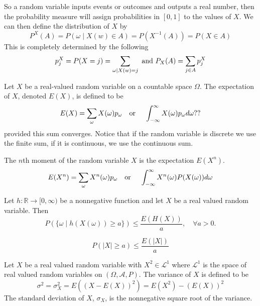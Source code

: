 \documentclass[../main.tex]{subfiles}
\begin{document}
\begin{remark}
So a random variable inputs events or outcomes and outputs a real number, then the probability measure will assign probabilities in $[0,1]$ to the values of $X$.
We can then define the distribution of $X$ by
\[
P^X(A) = P({\omega \mid X(w) \in A}) = P(X^{-1}(A)) = P(X \in A)
\]
This is completely determined by the following 
\[
p_j^X = P(X=j) = \sum_{\omega \mid X(w) =j} \textnormal{ and } P_X(A) = \sum_{j \in A}{p^X_j}
\]
\end{remark}

\begin{definition}
Let $X$ be a real-valued random variable on a countable space $\Omega$. The expectation of $X$, denoted $E(X)$, is defined to be 
\[
E(X) = \sum_{\omega}{X(\omega)p_\omega} \quad \textnormal{or } \quad \int_{-\infty}^{\infty}X(\omega)p_\omega d\omega??
\]
provided this sum converges. Notice that if the random variable is discrete we use the finite sum, if it is continuous, we use the continuous sum.
\end{definition}

\begin{definition}
The $n$th moment of the random variable $X$ is the expectation $E(X^n)$. 
\[
E(X^n) = \sum_{\omega}{X^n(\omega)p_\omega} \quad \textnormal{or } \quad \int_{-\infty}^{\infty}X^n(\omega)P(X(\omega)) d\omega
\]
\end{definition}



\begin{theorem}
Let $h: \mathbb{R} \to [0,\infty)$ be a nonnegative function and let $X$ be a real valued random variable. Then 
\[
P(\{\omega \mid h(X(\omega)) \geq a\}) \leq \frac{E(H(X))}{a}, \quad \forall a > 0.
\]
\end{theorem}



\begin{corollary} \label{Markovs Inequality}
\[
P({|X| \geq a}) \leq \frac{E(|X|)}{a}
\]

\end{corollary}



\begin{definition}\label{def: Variance and Standard Deviation}
Let $X$ be a real valued random variable with $X^2 \in \mathcal{L}^1$ where $\mathcal{L}^1$ is the space of real valued random variables on $(\Omega, \mathcal{A}, P)$. The variance of $X$ is defined to be
\[
\sigma^2 = \sigma^2_X = E((X - E(X))^2) = E(X^2) - (E(X))^2
\]
The standard deviation of $X$, $\sigma_X$, is the nonnegative square root of the variance. 

\end{definition}
\end{document}
